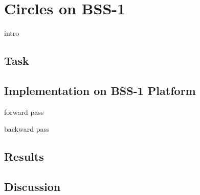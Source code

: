 \section{Circles on BSS-1}
intro

\subsection{Task}

\subsection{Implementation on BSS-1 Platform}
forward pass

backward pass

\subsection{Results}

\subsection{Discussion}
